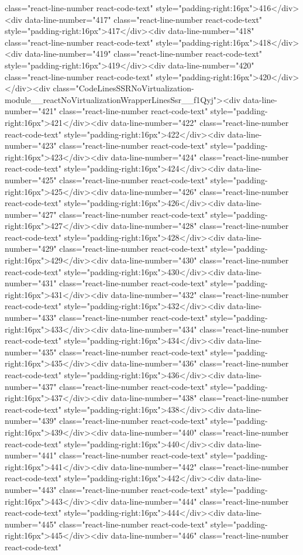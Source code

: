 {{{{{{{class="react-line-number react-code-text" style="padding-right:16px">416</div><div data-line-number="417" class="react-line-number react-code-text" style="padding-right:16px">417</div><div data-line-number="418" class="react-line-number react-code-text" style="padding-right:16px">418</div><div data-line-number="419" class="react-line-number react-code-text" style="padding-right:16px">419</div><div data-line-number="420" class="react-line-number react-code-text" style="padding-right:16px">420</div></div><div class="CodeLinesSSRNoVirtualization-module__reactNoVirtualizationWrapperLinesSsr__f1Qyj"><div data-line-number="421" class="react-line-number react-code-text" style="padding-right:16px">421</div><div data-line-number="422" class="react-line-number react-code-text" style="padding-right:16px">422</div><div data-line-number="423" class="react-line-number react-code-text" style="padding-right:16px">423</div><div data-line-number="424" class="react-line-number react-code-text" style="padding-right:16px">424</div><div data-line-number="425" class="react-line-number react-code-text" style="padding-right:16px">425</div><div data-line-number="426" class="react-line-number react-code-text" style="padding-right:16px">426</div><div data-line-number="427" class="react-line-number react-code-text" style="padding-right:16px">427</div><div data-line-number="428" class="react-line-number react-code-text" style="padding-right:16px">428</div><div data-line-number="429" class="react-line-number react-code-text" style="padding-right:16px">429</div><div data-line-number="430" class="react-line-number react-code-text" style="padding-right:16px">430</div><div data-line-number="431" class="react-line-number react-code-text" style="padding-right:16px">431</div><div data-line-number="432" class="react-line-number react-code-text" style="padding-right:16px">432</div><div data-line-number="433" class="react-line-number react-code-text" style="padding-right:16px">433</div><div data-line-number="434" class="react-line-number react-code-text" style="padding-right:16px">434</div><div data-line-number="435" class="react-line-number react-code-text" style="padding-right:16px">435</div><div data-line-number="436" class="react-line-number react-code-text" style="padding-right:16px">436</div><div data-line-number="437" class="react-line-number react-code-text" style="padding-right:16px">437</div><div data-line-number="438" class="react-line-number react-code-text" style="padding-right:16px">438</div><div data-line-number="439" class="react-line-number react-code-text" style="padding-right:16px">439</div><div data-line-number="440" class="react-line-number react-code-text" style="padding-right:16px">440</div><div data-line-number="441" class="react-line-number react-code-text" style="padding-right:16px">441</div><div data-line-number="442" class="react-line-number react-code-text" style="padding-right:16px">442</div><div data-line-number="443" class="react-line-number react-code-text" style="padding-right:16px">443</div><div data-line-number="444" class="react-line-number react-code-text" style="padding-right:16px">444</div><div data-line-number="445" class="react-line-number react-code-text" style="padding-right:16px">445</div><div data-line-number="446" class="react-line-number react-code-text" }}}}}}}
